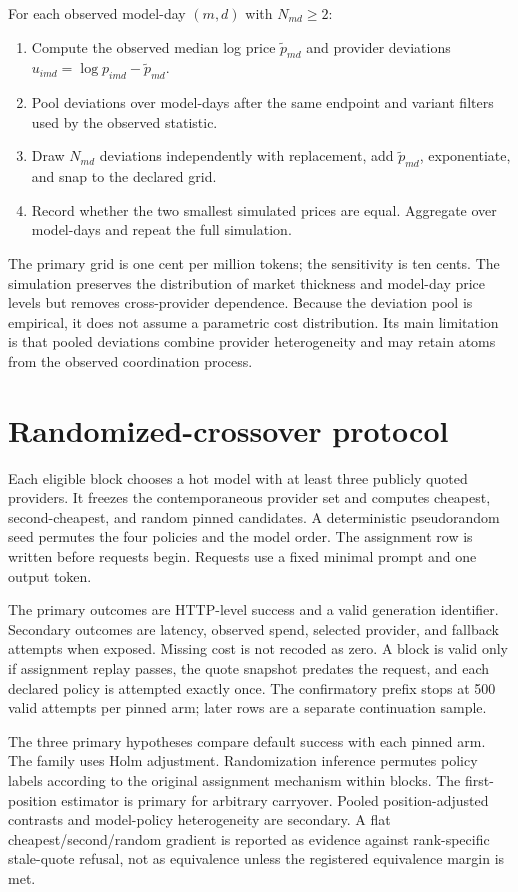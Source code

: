 \documentclass[11pt]{article}
\newcommand{\1}{\mathbf{1}}
\begin{document}
For each observed model-day $(m,d)$ with $N_{md}\geq2$:
\begin{enumerate}
  \item Compute the observed median log price $\widetilde{p}_{md}$ and provider
  deviations $u_{imd}=\log p_{imd}-\widetilde{p}_{md}$.
  \item Pool deviations over model-days after the same endpoint and variant
  filters used by the observed statistic.
  \item Draw $N_{md}$ deviations independently with replacement, add
  $\widetilde{p}_{md}$, exponentiate, and snap to the declared grid.
  \item Record whether the two smallest simulated prices are equal.  Aggregate
  over model-days and repeat the full simulation.
\end{enumerate}
The primary grid is one cent per million tokens; the sensitivity is ten cents.
The simulation preserves the distribution of market thickness and model-day price
levels but removes cross-provider dependence.  Because the deviation pool is
empirical, it does not assume a parametric cost distribution.  Its main limitation
is that pooled deviations combine provider heterogeneity and may retain atoms from
the observed coordination process.

\section{Randomized-crossover protocol}
\label{app:crossover}

Each eligible block chooses a hot model with at least three publicly quoted
providers.  It freezes the contemporaneous provider set and computes cheapest,
second-cheapest, and random pinned candidates.  A deterministic pseudorandom seed
permutes the four policies and the model order.  The assignment row is written
before requests begin.  Requests use a fixed minimal prompt and one output token.

The primary outcomes are HTTP-level success and a valid generation identifier.
Secondary outcomes are latency, observed spend, selected provider, and fallback
attempts when exposed.  Missing cost is not recoded as zero.  A block is valid only
if assignment replay passes, the quote snapshot predates the request, and each
declared policy is attempted exactly once.  The confirmatory prefix stops at 500
valid attempts per pinned arm; later rows are a separate continuation sample.

The three primary hypotheses compare default success with each pinned arm.  The
family uses Holm adjustment.  Randomization inference permutes policy labels
according to the original assignment mechanism within blocks.  The first-position
estimator is primary for arbitrary carryover.  Pooled position-adjusted contrasts
and model-policy heterogeneity are secondary.  A flat cheapest/second/random
gradient is reported as evidence against rank-specific stale-quote refusal, not as
equivalence unless the registered equivalence margin is met.
\end{document}

